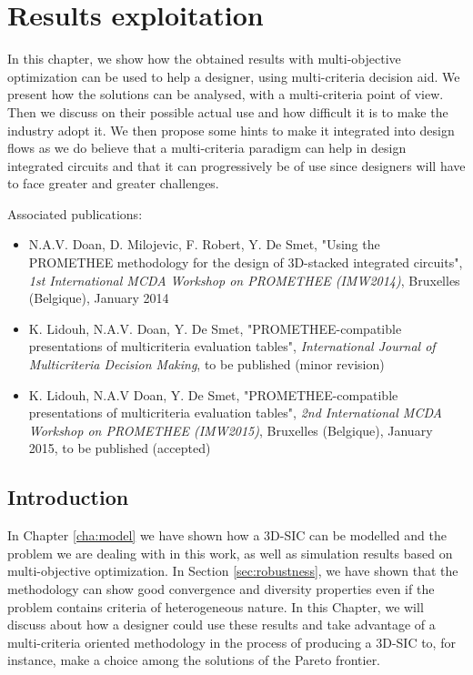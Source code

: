 \chapter{Results exploitation}
\label{cha:resultsexploit}

\begin{summary}
In this chapter, we show how the obtained results with multi-objective optimization can be used to help a designer, using multi-criteria decision aid. We present how the solutions can be analysed, with a multi-criteria point of view. Then we discuss on their possible actual use and how difficult it is to make the industry adopt it. We then propose some hints to make it integrated into design flows as we do believe that a multi-criteria paradigm can help in design integrated circuits and that it can progressively be of use since designers will have to face greater and greater challenges.
\end{summary}

Associated publications:
\begin{itemize}
\item N.A.V. Doan, D. Milojevic, F. Robert, Y. De Smet, "Using the PROMETHEE methodology for the design of 3D-stacked integrated circuits", \textit{1st International MCDA Workshop on PROMETHEE (IMW2014)}, Bruxelles (Belgique), January 2014
\item K. Lidouh, N.A.V. Doan, Y. De Smet, "PROMETHEE-compatible presentations of multicriteria evaluation tables", \textit{International Journal of Multicriteria Decision Making}, to be published (minor revision)
\item K. Lidouh, N.A.V Doan, Y. De Smet, "PROMETHEE-compatible presentations of multicriteria evaluation tables", \textit{2nd International MCDA Workshop on PROMETHEE (IMW2015)}, Bruxelles (Belgique), January 2015, to be published (accepted)
\end{itemize}

\section{Introduction}
In Chapter \ref{cha:model} we have shown how a 3D-SIC can be modelled and the problem we are dealing with in this work, as well as simulation results based on multi-objective optimization. In Section \ref{sec:robustness}, we have shown that the methodology can show good convergence and diversity properties even if the problem contains criteria of heterogeneous nature. In this Chapter, we will discuss about how a designer could use these results and take advantage of a multi-criteria oriented methodology in the process of producing a 3D-SIC to, for instance, make a choice among the solutions of the Pareto frontier.

